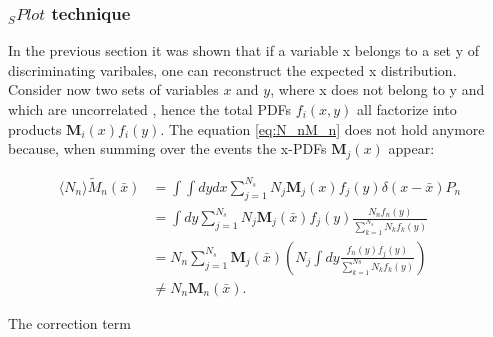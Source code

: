 \documentclass[english]{uzhpub}
\begin{document}
\subsubsection{$_{S} Plot$ technique}
In the previous section it was shown that if a variable x belongs to a set y of discriminating varibales, one can reconstruct the expected x distribution.
Consider now two sets of variables $x$ and $y$, where x does not belong to y and which are uncorrelated , hence the total PDFs $f_i (x,y)$ all factorize into products $\textbf{M}_i (x) f_i(y)$.
The equation \ref{eq:N_nM_n} does not hold anymore because, when summing over the events the x-PDFs $\textbf{M}_j(x)$ appear:

\begin{align}
  \langle N_n \rangle \tilde{M}_n (\bar{x}) &= \int \int dy dx \sum_{j=1}^{N_s} N_j \textbf{M}_j (x) f_j (y) \delta (x- \bar{x}) P_n \label{eq:M_nX} \\
  &= \int dy \sum_{j=1}^{N_s} N_j \textbf{M}_j (\bar{x}) f_j(y) \frac{N_n f_n(y)}{\sum_{k=1}^{N_s} N_k f_k(y)} \\
  &= N_n \sum_{j=1}^{N_s} \textbf{M}_j (\bar{x}) \left( N_j \int dy \frac{f_n(y) f_j(y)}{\sum_{k=1}^{Ns} N_k f_k (y)} \right) \\
  & \neq N_n \textbf{M}_n (\bar{x}).
\end{align}

The correction term
\end{document}
